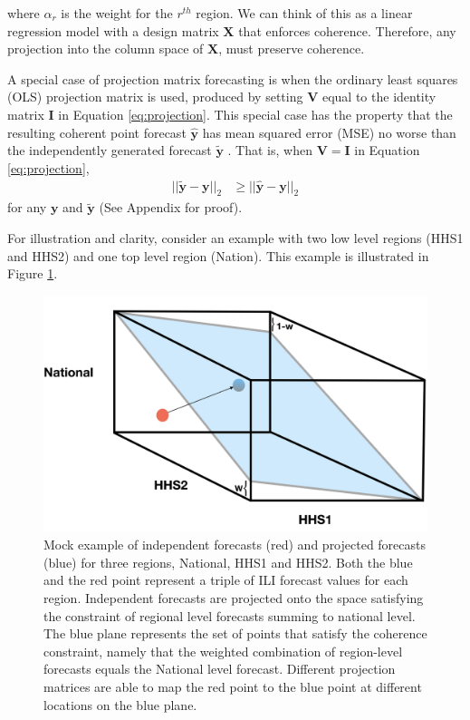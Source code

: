 \documentclass{umassthesis}          %
\begin{document}
\noindent where $\alpha_r$ is the weight for the $r^{th}$ region. We can think of this as a linear regression model with a design matrix $\bm{X}$ that enforces coherence. Therefore, any projection into the column space of $\bm{X}$, must preserve coherence.


A special case of projection matrix forecasting is when the ordinary least squares (OLS) projection matrix is used, produced by setting $\bm{V}$ equal to the identity matrix $\bm{I}$ in Equation \ref{eq:projection}. This special case has the property that the resulting coherent point forecast $\bm{\hat{y}}$ has mean squared error (MSE) no worse than the independently generated forecast $\bm{\tilde{y}}$ \cite{wickramasuriya2015forecasting}. That is, when $\bm{V}=\bm{I}$ in Equation \ref{eq:projection},
\begin{align}
 || \bm{\tilde{y}} - \bm{y}||_2 &\geq || \bm{\hat{y}} - \bm{y}||_2
\end{align}
\noindent for any $\bm{y}$ and $\bm{\tilde{y}}$ (See Appendix for proof).

For illustration and clarity, consider an example with two low level regions (HHS1 and HHS2) and one top level region (Nation). This example is illustrated in Figure \ref{fig:projection}.

   
\begin{figure}
    \centering
    \includegraphics[scale=.25]{projection.png}
    \caption{Mock example of independent forecasts (red) and projected forecasts (blue) for three regions, National, HHS1 and HHS2. Both the blue and the red point represent a triple of ILI forecast values for each region. Independent forecasts are projected onto the space satisfying the constraint of regional level forecasts summing to national level. The blue plane represents the set of points that satisfy the coherence constraint, namely that the weighted combination of region-level forecasts equals the National level forecast. Different projection matrices are able to map the red point to the blue point at different locations on the blue plane. }
    \label{fig:projection}
\end{figure}
\end{document}
